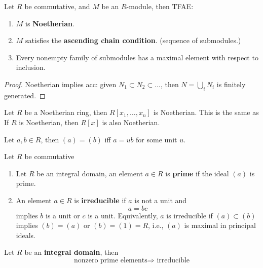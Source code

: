 \documentclass[openany]{book}
\begin{document}
\begin{prop}
    Let $R$ be commutative, and $M$ be an $R$-module, then TFAE:
    \begin{enumerate}
        \item $M$ is \textbf{Noetherian}.
        \item $M$ satisfies the \textbf{ascending chain condition}. (sequence of submodules.)
        \item Every nonempty family of submodules has a maximal element with respect to inclusion.
    \end{enumerate}
\end{prop}
\begin{proof}
    Noetherian implies acc: given $N_1\subset N_2\subset\dots$, then $N=\bigcup_iN_i$ is finitely generated. 
\end{proof}


\begin{prop}
    Let $R$ be a Noetherian ring, then $R[x_1,\dots, x_n]$ is Noetherian. This is the same as If $R$ is Noetherian, then $R[x]$ is also Noetherian.
\end{prop}

\begin{prop}
    Let $a,b\in R$, then $(a)=(b)$ iff $a=ub$ for some unit $u$.
\end{prop}



\begin{defn}
    Let $R$ be commutative
    \begin{enumerate}
        \item Let $R$ be an integral domain, an element $a\in R$ is \textbf{prime} if the ideal $(a)$ is prime.
        \item An element $a\in R$ is \textbf{irreducible} if $a$ is not a unit and 
        \begin{equation*}
            a=bc
        \end{equation*}
        implies $b$ is a unit or $c$ is a unit. Equivalently, $a$ is irreducible if $(a)\subset (b)$ implies $(b)=(a)$ or $(b)=(1)=R$, i.e., $(a)$ is maximal in principal ideals.
    \end{enumerate}
\end{defn}

\begin{prop}
    Let $R$ be an \textbf{integral domain}, then 
    \begin{equation*}
        \text{nonzero prime elements}\Rightarrow \text{ irreducible}
    \end{equation*}
\end{prop}
\end{document}
